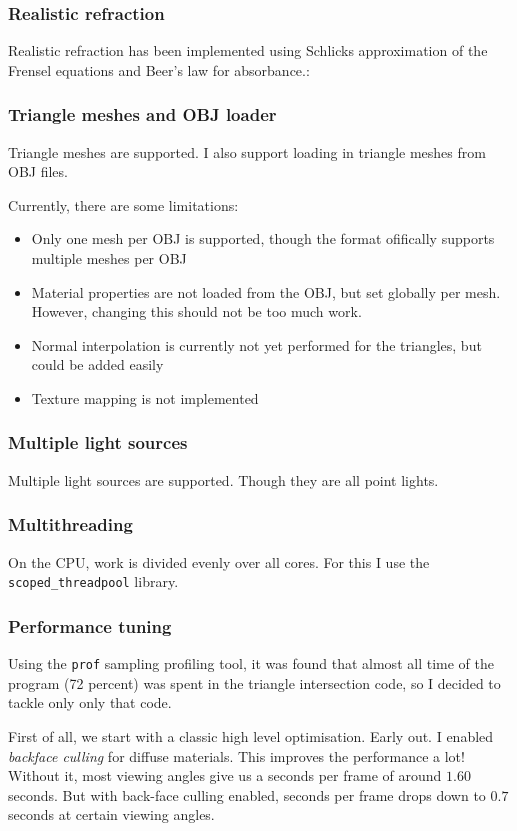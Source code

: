 \documentclass{article}
\begin{document}
\subsubsection{Realistic refraction}
Realistic refraction has been implemented using Schlicks approximation of the Frensel equations
and Beer's law for absorbance.:

\subsubsection{Triangle meshes and OBJ loader}
Triangle meshes are supported. I also support loading in triangle meshes from OBJ files.

Currently, there are some limitations:
\begin{itemize}
  \item Only one mesh per OBJ is supported, though the format ofifically supports multiple meshes per OBJ
  \item Material properties are not loaded from the OBJ, but set globally per
    mesh. However, changing this should not be too much work.
  \item Normal interpolation is currently not yet performed for the triangles, but could be added easily
  \item Texture mapping is not implemented
\end{itemize}

\subsubsection{Multiple light sources}
Multiple light sources are supported. Though they are all point lights.

\subsubsection{Multithreading}
On the CPU, work is divided evenly over all cores. For this I use the \texttt{scoped\_threadpool} library.

\subsubsection{Performance tuning}
Using the \texttt{prof} sampling profiling tool, it was found that almost all time of the
program (72 percent) was spent in the triangle intersection code, so I decided to tackle only only that code.

First of all, we start with a classic high level optimisation. Early out. I enabled \emph{backface culling} for diffuse materials. This improves the performance a lot!
Without it, most viewing angles give us a seconds per frame of around $1.60$ seconds.  But with back-face culling
enabled, seconds per frame drops down to $0.7$ seconds at certain viewing angles.
\end{document}
